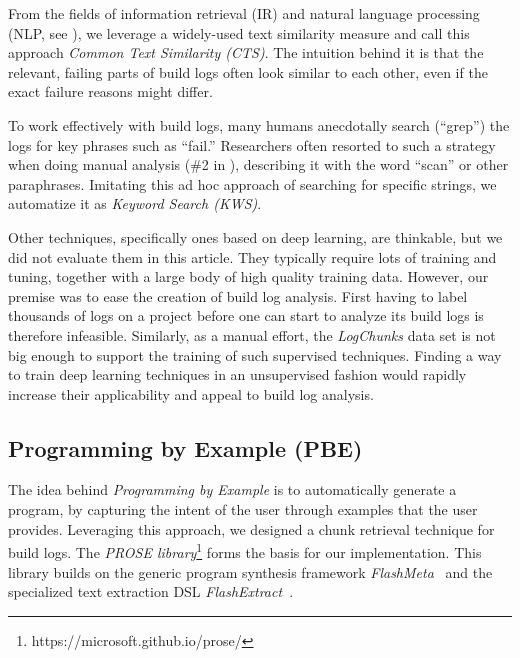 From the fields of information retrieval (IR) and natural
language
processing (NLP, see ), we leverage
a widely-used text similarity measure and call this approach \emph{Common
Text Similarity (CTS)}.
The intuition behind it is that the relevant,
failing parts of build logs often look similar to each other, even if
the exact failure reasons might differ.

To work effectively with build logs, many humans anecdotally search
(``grep'') the logs for key phrases such as ``fail.'' Researchers often
resorted to such a strategy when doing manual analysis (\#2
in ), describing it with the word ``scan''
or other paraphrases.
Imitating this ad hoc approach of searching for
specific strings, we automatize it as \emph{Keyword Search (KWS)}.

Other techniques, specifically ones based on deep learning, are
thinkable, but we did not evaluate them in this article.
They typically require lots of training and tuning,
together with a large body of high quality training data.
However, our premise was to ease
the creation of build log analysis.
First having to
label thousands of logs on a project before one can start to
analyze its build logs is therefore infeasible.
Similarly, as a manual
effort, the \emph{LogChunks} data set is not big enough to support the
training of such supervised techniques.
Finding a way to train deep learning techniques in
an unsupervised fashion would rapidly increase their applicability and
appeal to build log analysis.

\subsection{Programming by Example (PBE)}
The idea behind \emph{Programming by Example} is to automatically
generate a program, by capturing the
intent of the user through examples that the user provides.
Leveraging this approach, we designed a chunk retrieval technique
for build logs.
The \emph{PROSE library}\footnote{https://microsoft.github.io/prose/}
forms the basis for our implementation.
This library builds on the generic program synthesis framework
\emph{FlashMeta}~\citep{polozov2015flashmeta:} and the specialized
text extraction DSL \emph{FlashExtract}~\citep{le2014flashextract:}.


